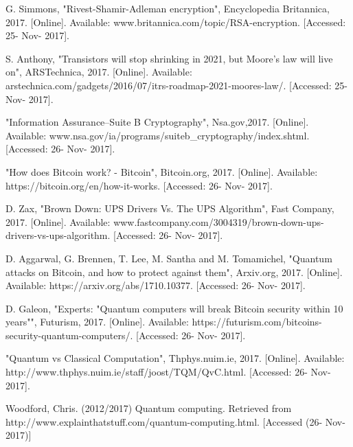 \documentclass[10pt,journal,compsoc]{IEEEtran}
\begin{document}
\begin{thebibliography}{1}
	
	G. Simmons, "Rivest-Shamir-Adleman encryption", Encyclopedia Britannica, 2017. [Online]. Available: www.britannica.com/topic/RSA-encryption. [Accessed: 25- Nov- 2017].
	
	S. Anthony, "Transistors will stop shrinking in 2021, but Moore’s law will live on", ARSTechnica, 2017. [Online]. Available: arstechnica.com/gadgets/2016/07/itrs-roadmap-2021-moores-law/. [Accessed: 25- Nov- 2017].
	
	"Information Assurance--Suite B Cryptography", Nsa.gov,2017. [Online]. Available: www.nsa.gov/ia/programs/suiteb\_cryptography/index.shtml. [Accessed: 26- Nov- 2017].
	
	"How does Bitcoin work? - Bitcoin", Bitcoin.org, 2017. [Online]. Available: https://bitcoin.org/en/how-it-works. [Accessed: 26- Nov- 2017].
	
	D. Zax, "Brown Down: UPS Drivers Vs. The UPS Algorithm", Fast Company, 2017. [Online]. Available: www.fastcompany.com/3004319/brown-down-ups-drivers-vs-ups-algorithm. [Accessed: 26- Nov- 2017].
	
	D. Aggarwal, G. Brennen, T. Lee, M. Santha and M. Tomamichel, "Quantum attacks on Bitcoin, and how to protect against them", Arxiv.org, 2017. [Online]. Available: https://arxiv.org/abs/1710.10377. [Accessed: 26- Nov- 2017].
	
	
	D. Galeon, "Experts: "Quantum computers will break Bitcoin security within 10 years"", Futurism, 2017. [Online]. Available: https://futurism.com/bitcoins-security-quantum-computers/. [Accessed: 26- Nov- 2017].


	"Quantum vs Classical Computation", Thphys.nuim.ie, 2017. [Online]. Available: http://www.thphys.nuim.ie/staff/joost/TQM/QvC.html. [Accessed: 26- Nov- 2017].
	
	Woodford, Chris. (2012/2017) Quantum computing. Retrieved from http://www.explainthatstuff.com/quantum-computing.html. [Accessed (26- Nov- 2017)] 	
\end{thebibliography}




\end{document}

